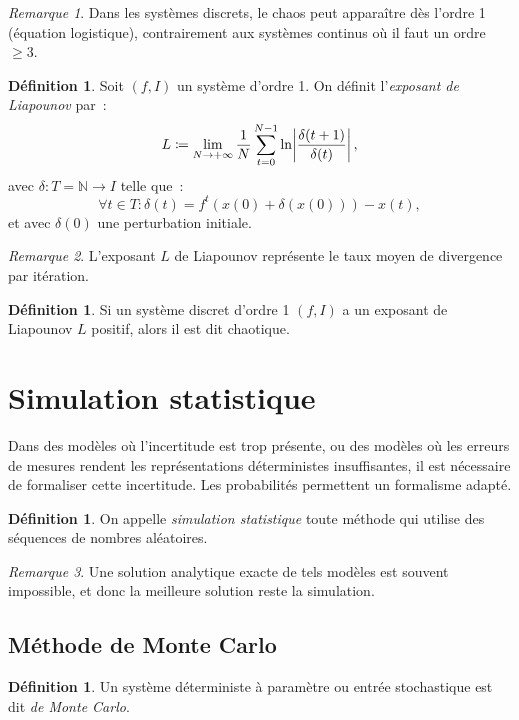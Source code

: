 \documentclass{article}
\theoremstyle{definition}
\newtheorem{déf}[thm]{Définition}
\theoremstyle{remark}
\newtheorem*{rmq}{Remarque}
\newcommand{\N}{\mathbb N}
\begin{document}
	\begin{rmq} Dans les systèmes discrets, le chaos peut apparaître dès l'ordre 1 (équation logistique), contrairement aux systèmes continus où il faut un
	ordre $\geq 3$.
	\end{rmq}

	\begin{déf} Soit $(f, I)$ un système d'ordre 1. On définit l'\textit{exposant de Liapounov} par~:
	\[L \coloneqq \lim_{N \to +\infty}\frac 1N\sum_{t=0}^{N-1}\ln \abs {\frac {\delta(t+1)}{\delta(t)}},\]
	avec $\delta : T = \N \to I$ telle que~:
	\[\forall t \in T : \delta(t) = f^t\left(x(0) + \delta(x(0))\right) - x(t),\]
	et avec $\delta(0)$ une perturbation initiale.
	\end{déf}

	\begin{rmq} L'exposant $L$ de Liapounov représente le taux moyen de divergence par itération.
	\end{rmq}

	\begin{déf} Si un système discret d'ordre 1 $(f, I)$ a un exposant de Liapounov $L$ positif, alors il est dit chaotique.
	\end{déf}

\section{Simulation statistique}
	Dans des modèles où l'incertitude est trop présente, ou des modèles où les erreurs de mesures rendent les représentations déterministes insuffisantes, il
	est nécessaire de formaliser cette incertitude. Les probabilités permettent un formalisme adapté.

	\begin{déf} On appelle \textit{simulation statistique} toute méthode qui utilise des séquences de nombres aléatoires.
	\end{déf}

	\begin{rmq} Une solution analytique exacte de tels modèles est souvent impossible, et donc la meilleure solution reste la simulation.
	\end{rmq}

	\subsection{Méthode de Monte Carlo}

	\begin{déf} Un système déterministe à paramètre ou entrée stochastique est dit \textit{de Monte Carlo}.
	\end{déf}
\end{document}
